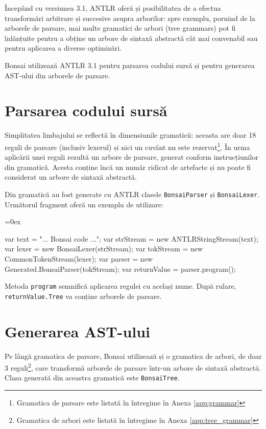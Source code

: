 \documentclass[12pt,a4paper]{memoir}
\renewcommand{\c}{\texttt}
\newenvironment{code}
{
\definecolor{shadecolor}{gray}{0.91}
\topsep=0ex
\relax
\shaded
\verbatim
}
{
\endverbatim
\endshaded
}
\begin{document}
Începând cu versiunea 3.1, ANTLR oferă și posibilitatea de a efectua transformări arbitrare și succesive asupra arborilor: spre exemplu, pornind de la arborele de parsare, mai multe gramatici de arbori (tree grammars) pot fi înlănțuite pentru a obține un arbore de sintaxă abstractă cât mai convenabil sau pentru aplicarea a diverse optimizări\cite{antlr_tree_grammars}\cite[cap. 8]{definitive_antlr_reference}.

Bonsai utilizează ANTLR 3.1 pentru parsarea codului sursă și pentru generarea AST-ului din arborele de parsare.

\section{Parsarea codului sursă}

Simplitatea limbajului se reflectă în dimensiunile gramaticii: aceasta are doar 18 reguli de parsare (inclusiv lexerul) și nici un cuvânt nu este rezervat\footnote{Gramatica de parsare este listată în întregime în Anexa \ref{app:grammar}}. În urma aplicării unei reguli rezultă un arbore de parsare, generat conform instrucțiunilor din gramatică. Acesta conține încă un număr ridicat de artefacte și nu poate fi considerat un arbore de sintaxă abstractă.

Din gramatică au fost generate cu ANTLR clasele \c{BonsaiParser} și \c{BonsaiLexer}. Următorul fragment oferă un exemplu de utilizare:

\begin{code}
var text = "... Bonsai code ...";
var strStream = new ANTLRStringStream(text);
var lexer = new BonsaiLexer(strStream);
var tokStream = new CommonTokenStream(lexer);
var parser = new Generated.BonsaiParser(tokStream);
var returnValue = parser.program();
\end{code}

Metoda \c{program} semnifică aplicarea regulei cu același nume. După rulare, \c{returnValue.Tree} va conține arborele de parsare.

\section{Generarea AST-ului}

Pe lângă gramatica de parsare, Bonsai utilizează și o gramatica de arbori, de doar 3 reguli\footnote{Gramatica de arbori este listată în întregime în Anexa \ref{app:tree_grammar}}, care transformă arborele de parsare într-un arbore de sintaxă abstractă. Clasa generată din aceastra gramatică este \c{BonsaiTree}.
\end{document}
